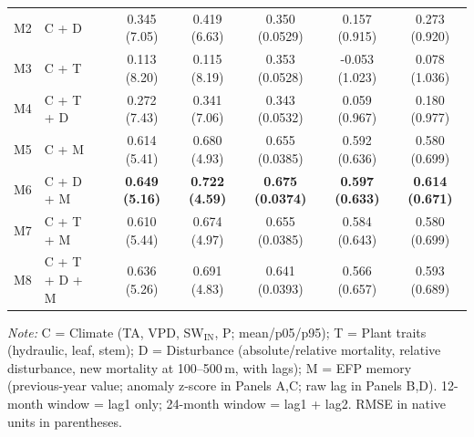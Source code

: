 \begin{table}[htbp]
\begin{tabular}{llcccccc}
M2 & C + D &  & 0.345 (7.05) & 0.419 (6.63) & 0.350 (0.0529) & 0.157 (0.915) & 0.273 (0.920) \\
M3 & C + T &  & 0.113 (8.20) & 0.115 (8.19) & 0.353 (0.0528) & -0.053 (1.023) & 0.078 (1.036) \\
M4 & C + T + D &  & 0.272 (7.43) & 0.341 (7.06) & 0.343 (0.0532) & 0.059 (0.967) & 0.180 (0.977) \\
M5 & C + M &  & 0.614 (5.41) & 0.680 (4.93) & 0.655 (0.0385) & 0.592 (0.636) & 0.580 (0.699) \\
M6 & C + D + M &  & \textbf{0.649 (5.16)} & \textbf{0.722 (4.59)} & \textbf{0.675 (0.0374)} & \textbf{0.597 (0.633)} & \textbf{0.614 (0.671)} \\
M7 & C + T + M &  & 0.610 (5.44) & 0.674 (4.97) & 0.655 (0.0385) & 0.584 (0.643) & 0.580 (0.699) \\
M8 & C + T + D + M &  & 0.636 (5.26) & 0.691 (4.83) & 0.641 (0.0393) & 0.566 (0.657) & 0.593 (0.689) \\
\midrule
\bottomrule
\end{tabular}
\vspace{2pt}
\begin{minipage}{\linewidth}
\footnotesize
\textit{Note:} C = Climate (TA, VPD, SW$_\mathrm{IN}$, P; mean/p05/p95); T = Plant traits (hydraulic, leaf, stem); D = Disturbance (absolute/relative mortality, relative disturbance, new mortality at 100--500\,m, with lags); M = EFP memory (previous-year value; anomaly z-score in Panels A,C; raw lag in Panels B,D). 12-month window = lag1 only; 24-month window = lag1 + lag2. RMSE in native units in parentheses.
\end{minipage}
\end{table}

